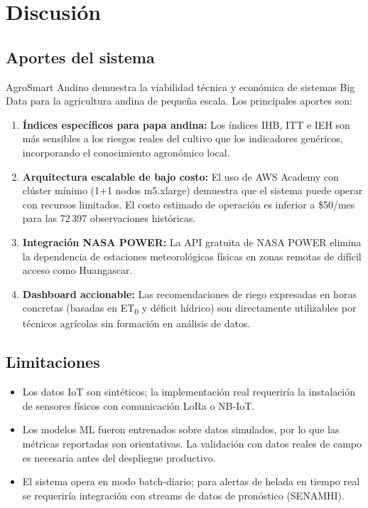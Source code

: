 \documentclass[12pt,a4paper]{article}
\begin{document}
\section{Discusión}

\subsection{Aportes del sistema}

AgroSmart Andino demuestra la viabilidad técnica y económica de sistemas
Big Data para la agricultura andina de pequeña escala. Los principales
aportes son:

\begin{enumerate}
  \item \textbf{Índices específicos para papa andina:} Los índices IHB,
    ITT e IEH son más sensibles a los riesgos reales del cultivo que los
    indicadores genéricos, incorporando el conocimiento agronómico local.

  \item \textbf{Arquitectura escalable de bajo costo:} El uso de AWS
    Academy con clúster mínimo (1+1 nodos m5.xlarge) demuestra que el
    sistema puede operar con recursos limitados. El costo estimado de
    operación es inferior a \$50/mes para las 72\,397 observaciones
    históricas.

  \item \textbf{Integración NASA POWER:} La API gratuita de NASA POWER
    elimina la dependencia de estaciones meteorológicas físicas en zonas
    remotas de difícil acceso como Huangascar.

  \item \textbf{Dashboard accionable:} Las recomendaciones de riego
    expresadas en horas concretas (basadas en ET\textsubscript{0} y
    déficit hídrico) son directamente utilizables por técnicos agrícolas
    sin formación en análisis de datos.
\end{enumerate}

\subsection{Limitaciones}

\begin{itemize}
  \item Los datos IoT son sintéticos; la implementación real requeriría
    la instalación de sensores físicos con comunicación LoRa o NB-IoT.
  \item Los modelos ML fueron entrenados sobre datos simulados, por lo
    que las métricas reportadas son orientativas. La validación con datos
    reales de campo es necesaria antes del despliegue productivo.
  \item El sistema opera en modo batch-diario; para alertas de helada en
    tiempo real se requeriría integración con streams de datos de
    pronóstico (SENAMHI).
\end{itemize}
\end{document}

